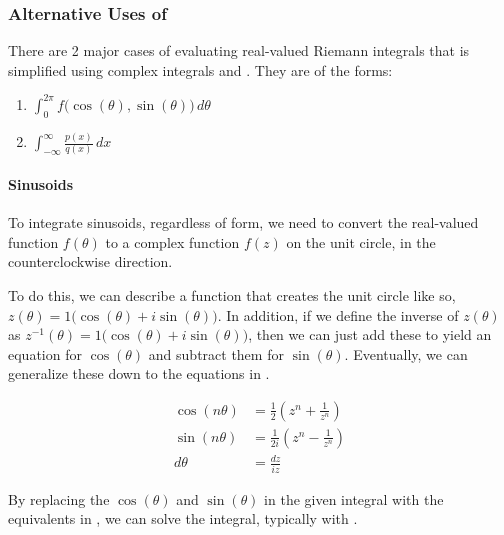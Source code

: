 \subsubsection{Alternative Uses of }\label{subsubsec:Alternative_Uses_Cauchys_Residue_Theorem}
There are 2 major cases of evaluating real-valued Riemann integrals that is simplified using complex integrals and .
They are of the forms:
\begin{enumerate}[noitemsep]
\item $\int_{0}^{2\pi} f \bigl( \cos(\theta), \sin(\theta) \bigr) \, d\theta$
\item $\int_{-\infty}^{\infty} \frac{p(x)}{q(x)} \, dx$
\end{enumerate}

\paragraph{Sinusoids}\label{par:Sinusoids_Cauchys_Residue_Theorem}
To integrate sinusoids, regardless of form, we need to convert the real-valued function $f(\theta)$ to a complex function $f(z)$ on the unit circle, in the counterclockwise direction.

To do this, we can describe a function that creates the unit circle like so, $z(\theta) = 1 \bigl( \cos(\theta) + i \sin(\theta) \bigr)$.
In addition, if we define the inverse of $z(\theta)$ as $z^{-1}(\theta) = 1 \bigl( \cos(\theta) + i \sin(\theta) \bigr)$, then we can just add these to yield an equation for $\cos(\theta)$ and subtract them for $\sin(\theta)$.
Eventually, we can generalize these down to the equations in .

\begin{equation}\label{eq:Real_to_Imaginary_Sinusoids}
  \begin{aligned}
    \cos(n \theta) &= \frac{1}{2} \left( z^{n} + \frac{1}{z^{n}} \right) \\
    \sin(n \theta) &= \frac{1}{2i} \left( z^{n} - \frac{1}{z^{n}} \right) \\
    d\theta &= \frac{dz}{i z}
  \end{aligned}
\end{equation}

By replacing the $\cos(\theta)$ and $\sin(\theta)$ in the given integral with the equivalents in , we can solve the integral, typically with .

